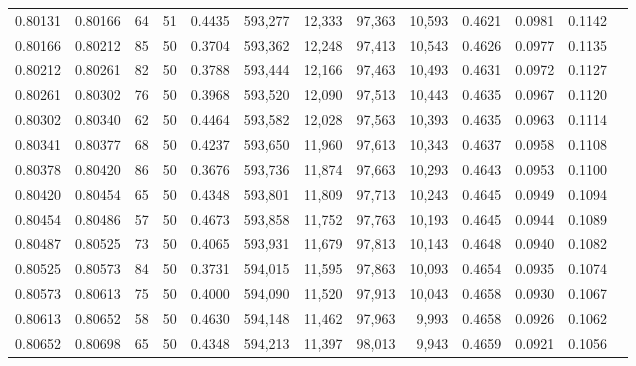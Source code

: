 \begin{tabular}{rrrrrrrrrrrrr}
0.80131 & 0.80166 &    64 &  51 &                                     0.4435 & 593,277 &  12,333 &  97,363 &  10,593 & 0.4621 & 0.0981 & 0.1142 \\
0.80166 & 0.80212 &    85 &  50 &                                     0.3704 & 593,362 &  12,248 &  97,413 &  10,543 & 0.4626 & 0.0977 & 0.1135 \\
0.80212 & 0.80261 &    82 &  50 &                                     0.3788 & 593,444 &  12,166 &  97,463 &  10,493 & 0.4631 & 0.0972 & 0.1127 \\
0.80261 & 0.80302 &    76 &  50 &                                     0.3968 & 593,520 &  12,090 &  97,513 &  10,443 & 0.4635 & 0.0967 & 0.1120 \\
0.80302 & 0.80340 &    62 &  50 &                                     0.4464 & 593,582 &  12,028 &  97,563 &  10,393 & 0.4635 & 0.0963 & 0.1114 \\
0.80341 & 0.80377 &    68 &  50 &                                     0.4237 & 593,650 &  11,960 &  97,613 &  10,343 & 0.4637 & 0.0958 & 0.1108 \\
0.80378 & 0.80420 &    86 &  50 &                                     0.3676 & 593,736 &  11,874 &  97,663 &  10,293 & 0.4643 & 0.0953 & 0.1100 \\
0.80420 & 0.80454 &    65 &  50 &                                     0.4348 & 593,801 &  11,809 &  97,713 &  10,243 & 0.4645 & 0.0949 & 0.1094 \\
0.80454 & 0.80486 &    57 &  50 &                                     0.4673 & 593,858 &  11,752 &  97,763 &  10,193 & 0.4645 & 0.0944 & 0.1089 \\
0.80487 & 0.80525 &    73 &  50 &                                     0.4065 & 593,931 &  11,679 &  97,813 &  10,143 & 0.4648 & 0.0940 & 0.1082 \\
0.80525 & 0.80573 &    84 &  50 &                                     0.3731 & 594,015 &  11,595 &  97,863 &  10,093 & 0.4654 & 0.0935 & 0.1074 \\
0.80573 & 0.80613 &    75 &  50 &                                     0.4000 & 594,090 &  11,520 &  97,913 &  10,043 & 0.4658 & 0.0930 & 0.1067 \\
0.80613 & 0.80652 &    58 &  50 &                                     0.4630 & 594,148 &  11,462 &  97,963 &   9,993 & 0.4658 & 0.0926 & 0.1062 \\
0.80652 & 0.80698 &    65 &  50 &                                     0.4348 & 594,213 &  11,397 &  98,013 &   9,943 & 0.4659 & 0.0921 & 0.1056 \\

\end{tabular}
